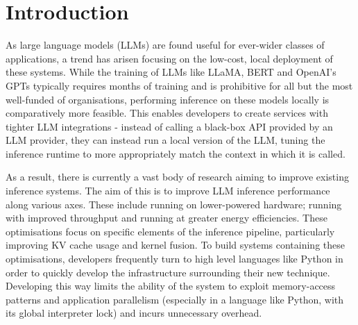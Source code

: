 \documentclass[12pt,twoside]{report}
\begin{document}



\clearpage{\pagestyle{empty}\cleardoublepage}
\setcounter{page}{1}
\pagestyle{fancy}

\begin{comment}
\begin{abstract}
Your abstract.
\end{abstract}
\end{comment}

\cleardoublepage
\begin{comment}
\section*{Acknowledgments}
Comment this out if not needed.

\end{comment}

\tableofcontents 


\setcounter{page}{1}
\fancyhead[LE,RO]{\slshape \rightmark}
\fancyhead[LO,RE]{\slshape \leftmark}

\chapter{Introduction} %
As large language models (LLMs) are found useful for ever-wider classes of applications, a trend has arisen focusing on the low-cost, local deployment of these systems.
While the training of LLMs like LLaMA, BERT and OpenAI's GPTs typically requires months of training and is prohibitive for all but the most well-funded of organisations, performing inference on these models locally is comparatively more feasible.
This enables developers to create services with tighter LLM integrations - instead of calling a black-box API provided by an LLM provider, they can instead run a local version of the LLM, tuning the inference runtime to more appropriately match the context in which it is called.

As a result, there is currently a vast body of research aiming to improve existing inference systems. 
The aim of this is to improve LLM inference performance along various axes.
These include running on lower-powered hardware; running with improved throughput and running at greater energy efficiencies.
These optimisations focus on specific elements of the inference pipeline, particularly improving KV cache usage and kernel fusion.
To build systems containing these optimisations, developers frequently turn to high level languages like Python in order to quickly develop the infrastructure surrounding their new technique.
Developing this way limits the ability of the system to exploit memory-access patterns and application parallelism (especially in a language like Python, with its global interpreter lock) and incurs unnecessary overhead.
\end{document}
